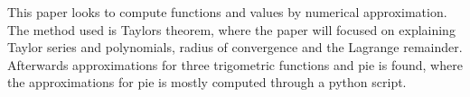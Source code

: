 This paper looks to compute functions and values by numerical approximation. The method used is Taylors theorem, where the paper will focused on explaining Taylor series and polynomials, radius of convergence and the Lagrange remainder. Afterwards approximations for three trigometric functions and pie is found, where the approximations for pie is mostly computed through a python script.